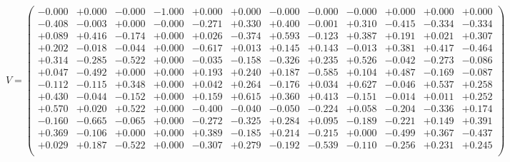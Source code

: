 \documentclass[9pt]{article}
\theoremstyle{plain}
\theoremstyle{definition}
\theoremstyle{remark}
\numberwithin{equation}{section}
\begin{document}
$V = \left(
\begin{array}{
cccccccccccc}
-0.000 & +0.000 & -0.000 & -1.000 & +0.000 & +0.000 & -0.000 & -0.000 & -0.000 & +0.000 & +0.000 & +0.000 \\
-0.408 & -0.003 & +0.000 & -0.000 & -0.271 & +0.330 & +0.400 & -0.001 & +0.310 & -0.415 & -0.334 & -0.334 \\
+0.089 & +0.416 & -0.174 & +0.000 & +0.026 & -0.374 & +0.593 & -0.123 & +0.387 & +0.191 & +0.021 & +0.307 \\
+0.202 & -0.018 & -0.044 & +0.000 & -0.617 & +0.013 & +0.145 & +0.143 & -0.013 & +0.381 & +0.417 & -0.464 \\
+0.314 & -0.285 & -0.522 & +0.000 & -0.035 & -0.158 & -0.326 & +0.235 & +0.526 & -0.042 & -0.273 & -0.086 \\
+0.047 & -0.492 & +0.000 & +0.000 & +0.193 & +0.240 & +0.187 & -0.585 & +0.104 & +0.487 & -0.169 & -0.087 \\
-0.112 & -0.115 & +0.348 & +0.000 & +0.042 & +0.264 & -0.176 & +0.034 & +0.627 & -0.046 & +0.537 & +0.258 \\
+0.430 & -0.044 & -0.152 & +0.000 & +0.159 & +0.615 & +0.360 & +0.413 & -0.151 & -0.014 & +0.011 & +0.252 \\
+0.570 & +0.020 & +0.522 & +0.000 & -0.400 & -0.040 & -0.050 & -0.224 & +0.058 & -0.204 & -0.336 & +0.174 \\
-0.160 & -0.665 & -0.065 & +0.000 & -0.272 & -0.325 & +0.284 & +0.095 & -0.189 & -0.221 & +0.149 & +0.391 \\
+0.369 & -0.106 & +0.000 & +0.000 & +0.389 & -0.185 & +0.214 & -0.215 & +0.000 & -0.499 & +0.367 & -0.437 \\
+0.029 & +0.187 & -0.522 & +0.000 & -0.307 & +0.279 & -0.192 & -0.539 & -0.110 & -0.256 & +0.231 & +0.245 \\
\end{array}
\right)$ \newline 
\end{document}

